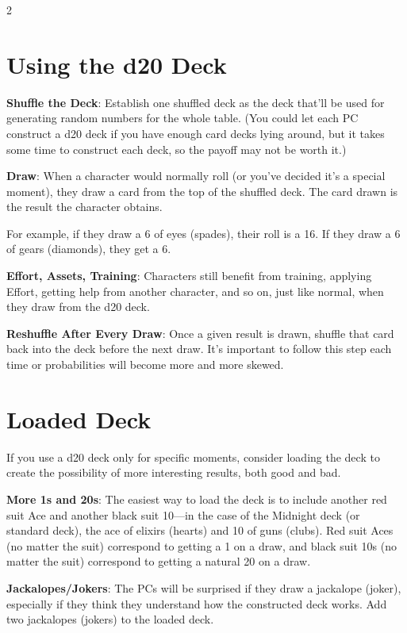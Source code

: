 \begin{multicols}{2}

\section{Using the d20 Deck}
 
\textbf{Shuffle the Deck}: Establish one shuffled deck as the deck that’ll be used for generating random numbers for the whole table. (You could let each PC construct a d20 deck if you have enough card decks lying around, but it takes some time to construct each deck, so the payoff may not be worth it.) 

\textbf{Draw}: When a character would normally roll (or you’ve decided it’s a special moment), they draw a card from the top of the shuffled deck. The card drawn is the result the character obtains. 

For example, if they draw a 6 of eyes (spades), their roll is a 16. If they draw a 6 of gears (diamonds), they get a 6. 

\textbf{Effort, Assets, Training}: Characters still benefit from training, applying Effort, getting help from another character, and so on, just like normal, when they draw from the d20 deck. 

\textbf{Reshuffle After Every Draw}: Once a given result is drawn, shuffle that card back into the deck before the next draw. It’s important to follow this step each time or probabilities will become more and more skewed.

\section{Loaded Deck}
 
If you use a d20 deck only for specific moments, consider loading the deck to create the possibility of more interesting results, both good and bad. 

\textbf{More 1s and 20s}: The easiest way to load the deck is to include another red suit Ace and another black suit 10—in the case of the Midnight deck (or standard deck), the ace of elixirs (hearts) and 10 of guns (clubs). Red suit Aces (no matter the suit) correspond to getting a 1 on a draw, and black suit 10s (no matter the suit) correspond to getting a natural 20 on a draw. 

\textbf{Jackalopes/Jokers}: The PCs will be surprised if they draw a jackalope (joker), especially if they think they understand how the constructed deck works. Add two jackalopes (jokers) to the loaded deck. 


\end{multicols}
